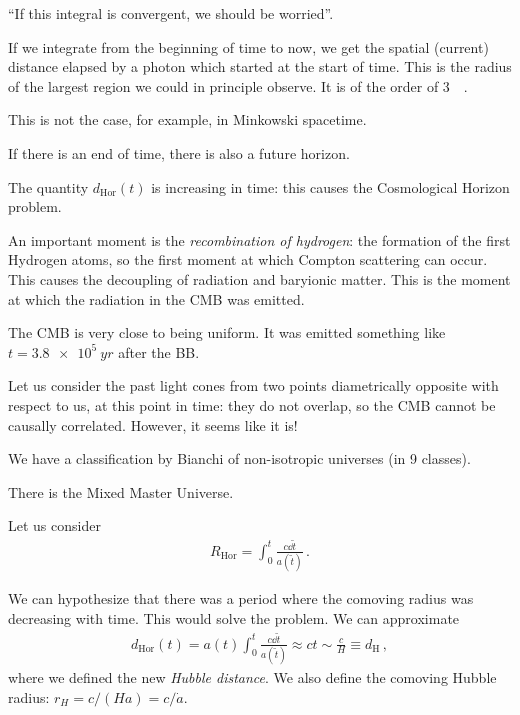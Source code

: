 \documentclass[main.tex]{subfiles}
\begin{document}
``If this integral is convergent, we should be worried''.

If we integrate from the beginning of time to now, we get the spatial (current) distance elapsed by a photon which started at the start of time. This is the radius of the largest region we could in principle observe. It is of the order of \SI{3}{\giga\parsec}.

This is not the case, for example, in Minkowski spacetime.

If there is an end of time, there is also a future horizon.

The quantity \(d _{\text{Hor}} (t) \) is increasing in time: this causes the Cosmological Horizon problem.


An important moment is the \emph{recombination of hydrogen}: the formation of the first Hydrogen atoms, so the first moment at which Compton scattering can occur.
This causes the decoupling of radiation and baryionic matter.
This is the moment at which the radiation in the CMB was emitted.

The CMB is very close to being uniform. It was emitted something like \(t = \SI{3.8e5}{yr}\) after the BB.

Let us consider the past light cones from two points diametrically opposite with respect to us, at this point in time: they do not overlap, so the CMB cannot be causally correlated. However, it seems like it is!


We have a classification by Bianchi of non-isotropic universes (in 9 classes).

There is the Mixed Master Universe.

Let us consider 
%
\begin{align}
  R _{\text{Hor}} = \int_0^{t} \frac{c \dd{\widetilde{t}} }{a(\widetilde{t})}
\,.
\end{align}

We can hypothesize that there was a period where the comoving radius was decreasing with time. This would solve the problem. 
We can approximate 
%
\begin{align}
  d _{\text{Hor}} (t) = a(t) \int_0^{t} \frac{c \dd{\widetilde{t}} }{a(\widetilde{t})} \approx ct \sim \frac{c}{H} \equiv
  d _{\text{H}}
\,,
\end{align}
%
where we defined the new \emph{Hubble distance}.
We also define the comoving Hubble radius: \(r_H = c/(Ha) = c / \dot{a} \).
\end{document}
